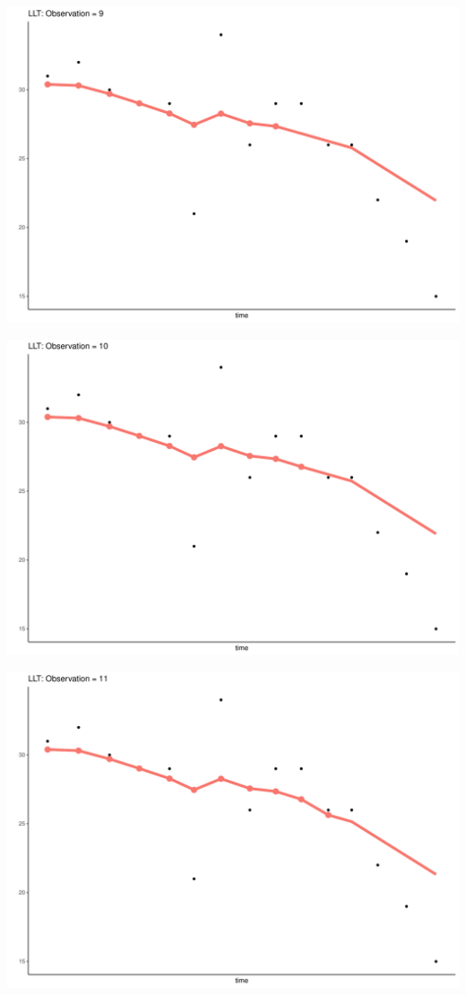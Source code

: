 \documentclass[
  ignorenonframetext,
]{beamer}
\begin{document}
\begin{frame}{}
\protect\hypertarget{section-38}{}
\includegraphics{Prez4_files/figure-beamer/unnamed-chunk-15-9.pdf}
\end{frame}

\begin{frame}{}
\protect\hypertarget{section-39}{}
\includegraphics{Prez4_files/figure-beamer/unnamed-chunk-15-10.pdf}
\end{frame}

\begin{frame}{}
\protect\hypertarget{section-40}{}
\includegraphics{Prez4_files/figure-beamer/unnamed-chunk-15-11.pdf}
\end{frame}
\end{document}
